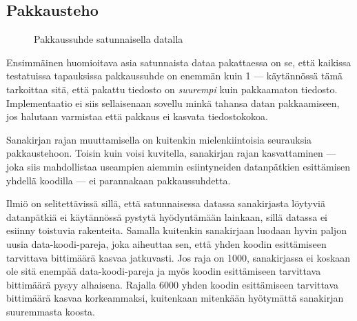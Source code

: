 \documentclass{article}
\begin{document}
\subsection{Pakkausteho}

\begin{figure}[h]
\centering
{}
\caption{Pakkaussuhde satunnaisella datalla}
\end{figure}

Ensimmäinen huomioitava asia satunnaista dataa pakattaessa on se, että kaikissa testatuissa tapauksissa pakkaussuhde on enemmän kuin 1 --- käytännössä tämä tarkoittaa sitä, että pakattu tiedosto on \emph{suurempi} kuin pakkaamaton tiedosto. Implementaatio ei siis sellaisenaan sovellu minkä tahansa datan pakkaamiseen, jos halutaan varmistaa että pakkaus ei kasvata tiedostokokoa.

Sanakirjan rajan muuttamisella on kuitenkin mielenkiintoisia seurauksia pakkaustehoon. Toisin kuin voisi kuvitella, sanakirjan rajan kasvattaminen --- joka siis mahdollistaa useampien aiemmin esiintyneiden datanpätkien esittämisen yhdellä koodilla --- ei parannakaan pakkaussuhdetta.

Ilmiö on selitettävissä sillä, että satunnaisessa datassa sanakirjasta löytyviä datanpätkiä ei käytännössä pystytä hyödyntämään lainkaan, sillä datassa ei esiinny toistuvia rakenteita. Samalla kuitenkin sanakirjaan luodaan hyvin paljon uusia data-koodi-pareja, joka aiheuttaa sen, että yhden koodin esittämiseen tarvittava bittimäärä kasvaa jatkuvasti. Jos raja on 1000, sanakirjassa ei koskaan ole sitä enempää data-koodi-pareja ja myös koodin esittämiseen tarvittava bittimäärä pysyy alhaisena. Rajalla 6000 yhden koodin esittämiseen tarvittava bittimäärä kasvaa korkeammaksi, kuitenkaan mitenkään hyötymättä sanakirjan suuremmasta koosta.
\end{document}
